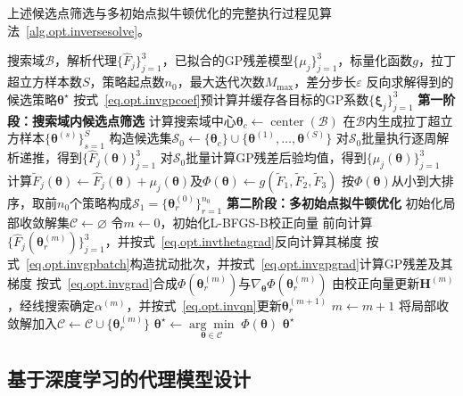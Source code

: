 上述候选点筛选与多初始点拟牛顿优化的完整执行过程见算法~\ref{alg.opt.inversesolve}。

\begin{algorithm}[H]
\caption{混合解析代理模型的两阶段反向求解流程}\label{alg.opt.inversesolve}
\begin{algorithmic}[1]
\REQUIRE 搜索域$\mathcal{B}$，解析代理$\{\hat F_j\}_{j=1}^{3}$，已拟合的GP残差模型$\{\mu_j\}_{j=1}^{3}$，标量化函数$g$，拉丁超立方样本数$S$，策略起点数$n_0$，最大迭代次数$M_{\max}$，差分步长$\varepsilon$
\ENSURE 反向求解得到的候选策略$\bm{\theta}^{\star}$
\STATE 按式~\eqref{eq.opt.invgpcoef}预计算并缓存各目标的GP系数$\{\bm{\xi}_j\}_{j=1}^{3}$
\STATE \textbf{第一阶段：搜索域内候选点筛选}
\STATE 计算搜索域中心$\bm{\theta}_c\leftarrow\operatorname{center}(\mathcal{B})$
\STATE 在$\mathcal{B}$内生成拉丁超立方样本$\{\bm{\theta}^{(s)}\}_{s=1}^{S}$
\STATE 构造候选集$\mathcal{S}_0\leftarrow\{\bm{\theta}_c\}\cup\{\bm{\theta}^{(1)},\ldots,\bm{\theta}^{(S)}\}$
\STATE 对$\mathcal{S}_0$批量执行逐周解析递推，得到$\{\hat F_j(\bm{\theta})\}_{j=1}^{3}$
\STATE 对$\mathcal{S}_0$批量计算GP残差后验均值，得到$\{\mu_j(\bm{\theta})\}_{j=1}^{3}$
\STATE 计算$\tilde F_j(\bm{\theta})\leftarrow\hat F_j(\bm{\theta})+\mu_j(\bm{\theta})$及$\Phi(\bm{\theta})\leftarrow g(\tilde F_1,\tilde F_2,\tilde F_3)$
\STATE 按$\Phi(\bm{\theta})$从小到大排序，取前$n_0$个策略构成$\mathcal{S}_1=\{\bm{\theta}^{(0)}_r\}_{r=1}^{n_0}$
\STATE \textbf{第二阶段：多初始点拟牛顿优化}
\STATE 初始化局部收敛解集$\mathcal{C}\leftarrow\varnothing$
  \STATE 令$m\leftarrow0$，初始化L-BFGS-B校正向量
    \STATE 前向计算$\{\hat F_j(\bm{\theta}^{(m)}_r)\}_{j=1}^{3}$，并按式~\eqref{eq.opt.invthetagrad}反向计算其梯度
    \STATE 按式~\eqref{eq.opt.invgpbatch}构造扰动批次，并按式~\eqref{eq.opt.invgpgrad}计算GP残差及其梯度
    \STATE 按式~\eqref{eq.opt.invgrad}合成$\Phi(\bm{\theta}^{(m)}_r)$与$\nabla_{\bm{\theta}}\Phi(\bm{\theta}^{(m)}_r)$
    \STATE 由校正向量更新$\bm H^{(m)}$，经线搜索确定$\alpha^{(m)}$，并按式~\eqref{eq.opt.invqn}更新$\bm{\theta}^{(m+1)}_r$
    \STATE $m\leftarrow m+1$
  \ENDWHILE
  \STATE 将局部收敛解加入$\mathcal{C}\leftarrow\mathcal{C}\cup\{\bm{\theta}^{(m)}_r\}$
\ENDFOR
\STATE $\bm{\theta}^{\star}\leftarrow\underset{\bm{\theta}\in\mathcal{C}}{\arg\min}\;\Phi(\bm{\theta})$
\RETURN $\bm{\theta}^{\star}$
\end{algorithmic}
\end{algorithm}

\subsection{基于深度学习的代理模型设计} \label{subsec.opt.anal.dl}

